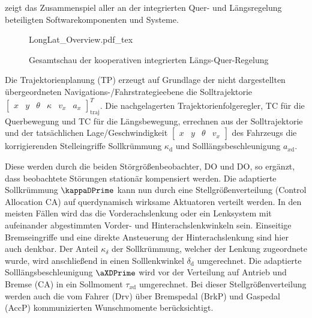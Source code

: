  zeigt das Zusammenspiel aller an der integrierten Quer- und Längsregelung beteiligten Softwarekomponenten und Systeme.

\begin{figure}[htp!]
\centering

\begingroup
\renewcommand*{\arraystretch}{0.75}
{LongLat_Overview.pdf_tex}
\endgroup

\caption{Gesamtschau der kooperativen integrierten Längs-Quer-Regelung}
\label{fig:LongLatOverview}
\end{figure}


Die Trajektorienplanung (TP) erzeugt auf Grundlage der nicht dargestellten übergeordneten Navigations-/Fahrstrategieebene die Solltrajektorie 
$\begin{bmatrix}x & y & \theta & \kappa & v_x & a_x\end{bmatrix}^T_\mathrm{traj}$. Die nachgelagerten Trajektorienfolgeregler, TC für die Querbewegung und TC für die Längsbewegung, errechnen aus der Solltrajektorie und der tatsächlichen Lage/Geschwindigkeit
$\begin{bmatrix}x & y & \theta & v_x\end{bmatrix}$ des Fahrzeugs die korrigierenden Stelleingriffe Sollkrümmung $\kappa_\mathrm{d}$ und Solllängsbeschleunigung $a_{x\mathrm{d}}$.

Diese werden durch die beiden Störgrößenbeobachter, DO\sus{$\kappa$} und DO, so ergänzt, dass beobachtete Störungen stationär kompensiert werden. Die adaptierte Sollkrümmung
$\kappaDPrime$ kann nun durch eine Stellgrößenverteilung (Control Allocation CA\sus{$\kappa$}) auf querdynamisch wirksame Aktuatoren verteilt werden. In den meisten Fällen wird das die Vorderachslenkung oder ein Lenksystem mit aufeinander abgestimmten Vorder- und Hinterachslenkwinkeln sein. Einseitige Bremseingriffe und eine direkte Ansteuerung der Hinterachslenkung sind hier auch denkbar. Der Anteil $\kappa_\delta$ der Sollkrümmung, welcher der Lenkung zugeordnete wurde, wird anschließend in einen Solllenkwinkel $\delta_\mathrm{d}$ umgerechnet. Die adaptierte Solllängsbeschleunigung $\aXDPrime$ wird vor der Verteilung auf Antrieb und Bremse (CA) in ein Sollmoment $\tau_{x\mathrm d}$ umgerechnet. Bei dieser Stellgrößenverteilung werden auch die vom Fahrer (Drv) über Bremspedal (BrkP) und Gaspedal (AccP) kommunizierten Wunschmomente berücksichtigt.

